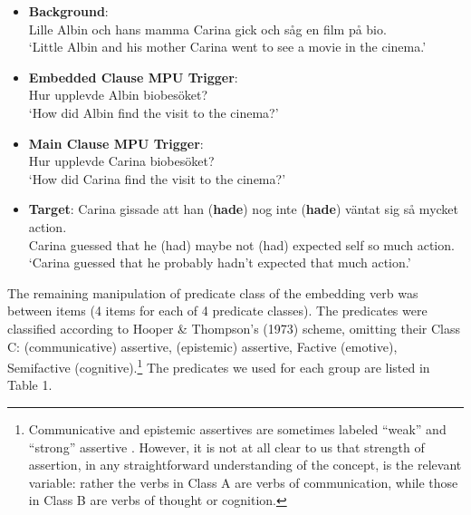 \documentclass[output=paper]{LSP/langsci}
\begin{document}
\begin{exe}
\ex \label{expt2:materials}\begin{itemize}
\item[] \textbf{Background}: \\ 
Lille Albin och hans mamma Carina gick och s{\aa}g en film p{\aa} bio. \\ 
`Little Albin and his mother Carina went to see a movie in the cinema.'
\item[] \textbf{Embedded Clause MPU Trigger}:\\ 
Hur upplevde Albin biobes\"oket?\\ 
`How did Albin find the visit to the cinema?' 
\item[] \textbf{Main Clause MPU Trigger}:  \\ 
Hur upplevde  Carina biobes\"oket? \\ 
`How did Carina find the visit to the cinema?'
\item[] \textbf{Target}: 
\gll Carina gissade att han (\textbf{hade}) nog inte (\textbf{hade}) v\"antat sig s{\aa} mycket action.\\
Carina guessed that he (had) maybe not (had) expected self so much action.\\
\trans `Carina guessed that he probably hadn't expected that much action.'
\end{itemize}
\end{exe}


The remaining manipulation of predicate class of the embedding verb was between items (4 items for each of 4 predicate classes).  The predicates were classified according to Hooper \& Thompson's (1973) scheme, omitting their Class C: (communicative) assertive, (epistemic) assertive, Factive (emotive), Semifactive
(cognitive).\footnote{Communicative and epistemic assertives are sometimes labeled ``weak'' and ``strong'' assertive \cite{wiklund-etal09}. However, it is not at all clear to us that strength of assertion, in any straightforward understanding of the concept, is the relevant variable: rather the verbs in Class A are verbs of communication, while those in Class B are verbs of thought or cognition.} The predicates we used for each group are listed in Table 1. 
\end{document}
